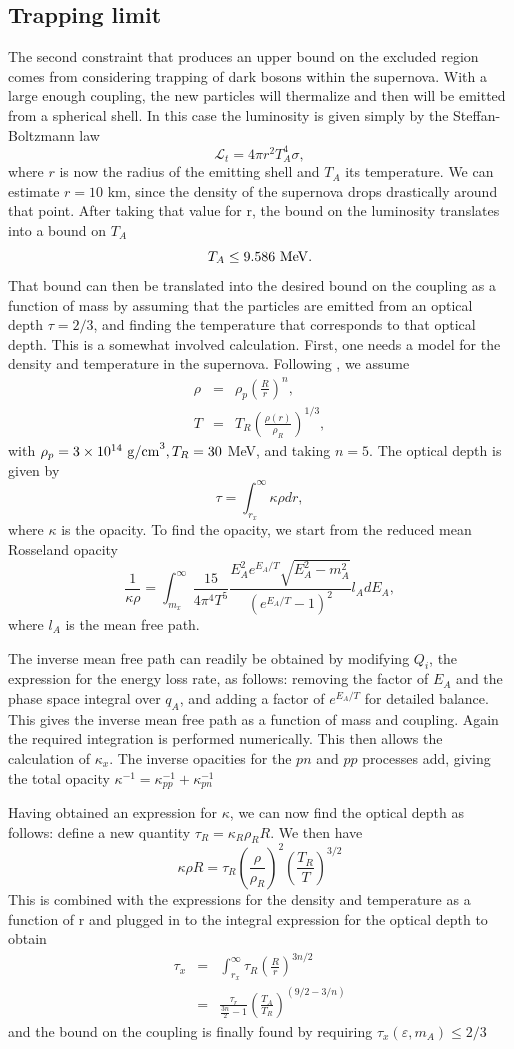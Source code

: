 \documentclass[nofootinbib,prd,superscriptaddress,twocolumn]{revtex4}
\newcommand{\beq}{\begin{equation}}
\newcommand{\eeq}{\end{equation}}
\newcommand{\bea}{\begin{eqnarray}}
\newcommand{\eea}{\end{eqnarray}}
\begin{document}
\subsection{Trapping limit}
The second constraint that produces an upper bound on the excluded region comes from considering trapping of dark bosons within the supernova. With a large enough coupling, the new particles will thermalize and then will be emitted from a spherical shell.  In this case the luminosity is given simply by the Steffan-Boltzmann law
\beq
\mathcal{L}_t  = 4\pi r^2 T_A^4 \sigma,
\eeq
where $ r $ is now the radius of the emitting shell and $ T_A $ its temperature. We can estimate $ r = 10$ km, since the density of the supernova drops drastically around that point. After taking that value for r, the bound on the luminosity translates into a bound on $ T_A $ 
\beq
T_A \le 9.586\rm\ MeV.
\eeq
That bound can then be translated into the desired bound on the coupling as a function of mass by assuming that the particles are emitted from an optical depth $ \tau = 2/3 $, and finding the temperature that corresponds to that optical depth. This is a somewhat involved calculation.
First, one needs a model for the density and temperature in the supernova. Following \cite{dent_etal12}, we assume 
\bea
\rho &=& \rho_p \left(\frac{R}{r}\right)^n,\\
T &=& T_R \left(\frac{\rho(r)}{\rho_R}\right)^{1/3},
\eea
with $  \rho_p  = 3\times10^{14}\ {\rm g/cm}^3, T_R = 30$ MeV, and taking $ n = 5 $. The optical depth is given by 
\beq
\tau = \int_{r_x}^{\infty} \kappa \rho dr,
\eeq
where $ \kappa$ is the opacity.  To find the opacity, we start from the reduced mean Rosseland opacity 
\beq
\frac{1}{\kappa \rho} = \int_{m_x}^{\infty} \frac{15}{4 \pi^4 T^5} \frac{E_A^2 e^{E_A/T} \sqrt{E_A^2 - m_A^2}}{(e^{E_A/T}-1)^2} l_A dE_A,
\eeq
where $ l_A $ is the mean free path. 
	
The inverse mean free path can readily be obtained by modifying $ Q_i $, the expression for the energy loss rate, as follows: removing the factor of $ E_A $ and the phase space integral over $ q_A $, and adding a factor of $ e^{E_A/T} $ for detailed balance. This gives the inverse mean free path as a function of mass and coupling. Again the required integration is performed numerically. This then allows the calculation of $ \kappa_x $. The inverse opacities for the $pn$ and $pp$ processes add, giving the total opacity $ \kappa^{-1} = \kappa_{pp}^{-1} + \kappa_{pn}^{-1} $
	
Having obtained an expression for $ \kappa $, we can now find the optical depth as follows: define a new quantity $ \tau_R = \kappa_R \rho_R R $. We then have 
\beq \kappa \rho R = \tau_R (\frac{\rho}{\rho_R})^2 (\frac{T_R}{T})^{3/2}  \eeq
This is combined with the expressions for the density and temperature as a function of r and plugged in to the integral expression for the optical depth to obtain 
\bea \tau_x &=& \int_{r_x}^{\infty} \tau_R (\frac{R}{r})^{3n/2} \\
 &=& \frac{\tau_r}{\frac{3n}{2}-1} (\frac{T_A}{T_R})^{(9/2-3/n)} \eea
and the bound on the coupling is finally found by requiring  $ \tau_x(\varepsilon,m_A) \le 2/3 $
	
\end{document}
